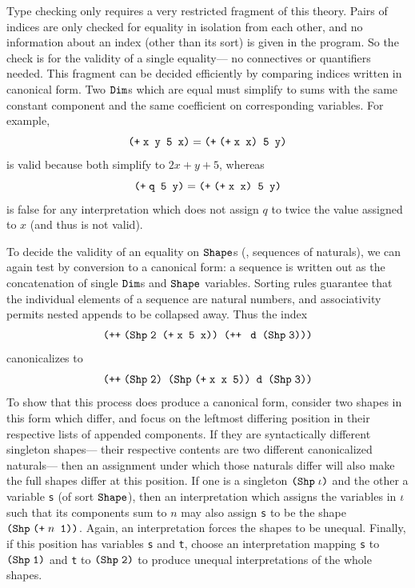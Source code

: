 Type checking only requires a very restricted fragment of this theory.
Pairs of indices are only checked for equality in isolation from each other,
and no information about an index
(other than its sort)
is given in the program.
So the check is for the validity of a single equality---%
no connectives or quantifiers needed.
This fragment can be decided efficiently by
comparing indices written in canonical form.
Two $\text{\tt Dim}$s which are equal must simplify to sums with
the same constant component
and the same coefficient on corresponding variables.
For example,
\[\idxadd{\text{\tt x y 5 x}} = \idxadd{\idxadd{\text{\tt x x}} \text{\tt\ 5 y}}\]
is valid
because both simplify to $2x+y+5$,
whereas
\[\idxadd{\text{\tt q 5 y}} = \idxadd{\idxadd{\text{\tt x x}} \text{\tt\ 5 y}}\]
is false for any interpretation which
does not assign $q$ to twice the value assigned to $x$
(and thus is not valid).

To decide the validity of an equality on $\text{\tt Shape}$s
(\ie, sequences of naturals),
we can again test by conversion to a canonical form:
a sequence is written out as the concatenation of
single $\text{\tt Dim}$s and $\text{\tt Shape}$ variables.
Sorting rules guarantee that
the individual elements of a sequence are natural numbers,
and associativity permits nested appends to be collapsed away.
Thus the index
\[\idxappend%
{\idxshape{\text{\tt 2\ }\idxadd{\text{\tt x 5 x}}}
  \text{\tt\ }
  \idxappend{\text{\tt\ d\ } \idxshape{\text{\tt3}}}}\]
canonicalizes to
\[\idxappend%
{\idxshape{\text{\tt 2}}
  \text{\tt\ }
  \idxshape{\idxadd{\text{\tt x x 5}}}
  \text{\tt\ d\ }
  \idxshape{\text{\tt 3}}}\]
To show that this process does produce a canonical form,
consider two shapes in this form which differ,
and focus on the leftmost differing position
in their respective lists of appended components.
If they are syntactically different singleton shapes---%
their respective contents are two different canonicalized naturals---%
then an assignment under which those naturals differ
will also make the full shapes differ at this position.
If one is a singleton $\idxshape{\idx}$ and the other a variable {\tt s}
(of sort $\text{\tt Shape}$),
then an interpretation which assigns
the variables in $\mathit{\iota}$ such that its components sum to $n$
may also assign {\tt s} to be the shape $\idxshape{\idxadd{n \text{\tt\ 1}}}$.
Again, an interpretation forces the shapes to be unequal.
Finally, if this position has variables {\tt s} and {\tt t},
choose an interpretation mapping
{\tt s} to $\idxshape{\text{\tt 1}}$
and {\tt t} to $\idxshape{\text{\tt 2}}$
to produce unequal interpretations of the whole shapes.

